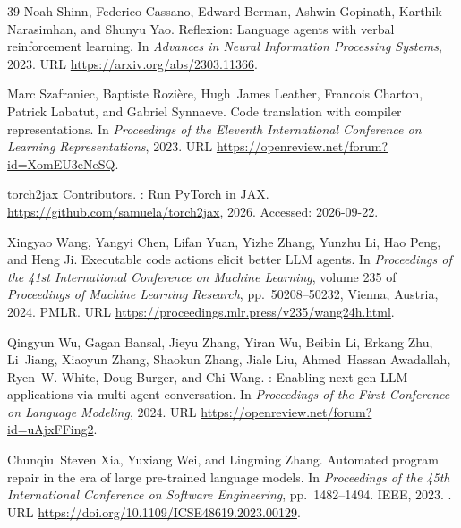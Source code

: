 \documentclass{article}
\begin{document}
\begin{thebibliography}{39}
Noah Shinn, Federico Cassano, Edward Berman, Ashwin Gopinath, Karthik
  Narasimhan, and Shunyu Yao.
\newblock Reflexion: Language agents with verbal reinforcement learning.
\newblock In \emph{Advances in Neural Information Processing Systems}, 2023.
\newblock URL \url{https://arxiv.org/abs/2303.11366}.

Marc Szafraniec, Baptiste Rozi{\`e}re, Hugh~James Leather, Francois Charton,
  Patrick Labatut, and Gabriel Synnaeve.
\newblock Code translation with compiler representations.
\newblock In \emph{Proceedings of the Eleventh International Conference on
  Learning Representations}, 2023.
\newblock URL \url{https://openreview.net/forum?id=XomEU3eNeSQ}.

{torch2jax Contributors}.
: Run {PyTorch} in {JAX}.
\newblock \url{https://github.com/samuela/torch2jax}, 2026.
\newblock Accessed: 2026-09-22.

Xingyao Wang, Yangyi Chen, Lifan Yuan, Yizhe Zhang, Yunzhu Li, Hao Peng, and
  Heng Ji.
\newblock Executable code actions elicit better {LLM} agents.
\newblock In \emph{Proceedings of the 41st International Conference on Machine
  Learning}, volume 235 of \emph{Proceedings of Machine Learning Research},
  pp.\  50208--50232, Vienna, Austria, 2024. PMLR.
\newblock URL \url{https://proceedings.mlr.press/v235/wang24h.html}.

Qingyun Wu, Gagan Bansal, Jieyu Zhang, Yiran Wu, Beibin Li, Erkang Zhu,
  Li~Jiang, Xiaoyun Zhang, Shaokun Zhang, Jiale Liu, Ahmed~Hassan Awadallah,
  Ryen~W. White, Doug Burger, and Chi Wang.
: Enabling next-gen {LLM} applications via multi-agent
  conversation.
\newblock In \emph{Proceedings of the First Conference on Language Modeling},
  2024.
\newblock URL \url{https://openreview.net/forum?id=uAjxFFing2}.

Chunqiu~Steven Xia, Yuxiang Wei, and Lingming Zhang.
\newblock Automated program repair in the era of large pre-trained language
  models.
\newblock In \emph{Proceedings of the 45th International Conference on Software
  Engineering}, pp.\  1482--1494. IEEE, 2023.
\newblock {}.
\newblock URL \url{https://doi.org/10.1109/ICSE48619.2023.00129}.


\end{thebibliography}
\end{document}
